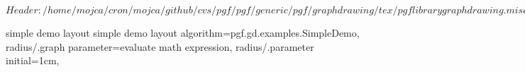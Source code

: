 %
%
%

\ProvidesFileRCS[v\pgfversion] $Header: /home/mojca/cron/mojca/github/cvs/pgf/pgf/generic/pgf/graphdrawing/tex/pgflibrarygraphdrawing.misc.code.tex,v 1.2 2012/04/19 13:49:07 tantau Exp $



%
%
\pgfgddeclarealgorithmkey
  {simple demo layout}
  {simple demo layout}
  {
    algorithm=pgf.gd.examples.SimpleDemo,
    radius/.graph parameter=evaluate math expression,
    radius/.parameter initial=1cm,
  }



\endinput